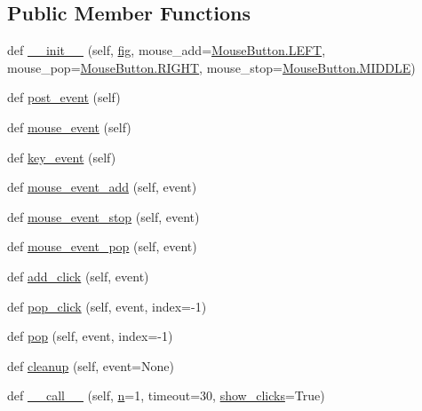 \subsection*{Public Member Functions}
\begin{DoxyCompactItemize}
\item 
def \hyperlink{classmatplotlib_1_1blocking__input_1_1BlockingMouseInput_affed301b1e6e9573ab60438a6ea2d34c}{\+\_\+\+\_\+init\+\_\+\+\_\+} (self, \hyperlink{classmatplotlib_1_1blocking__input_1_1BlockingInput_aee554aa34b7799bef4ad2406ed6a7e0c}{fig}, mouse\+\_\+add=\hyperlink{classmatplotlib_1_1backend__bases_1_1MouseButton_ae8e233d820706cbadfe957ae465eeb95}{Mouse\+Button.\+L\+E\+FT}, mouse\+\_\+pop=\hyperlink{classmatplotlib_1_1backend__bases_1_1MouseButton_a978a5d3296f60f59521a4e671cada7c8}{Mouse\+Button.\+R\+I\+G\+HT}, mouse\+\_\+stop=\hyperlink{classmatplotlib_1_1backend__bases_1_1MouseButton_ae501ff34ab8b37895cebc5046cc651a7}{Mouse\+Button.\+M\+I\+D\+D\+LE})
\item 
def \hyperlink{classmatplotlib_1_1blocking__input_1_1BlockingMouseInput_a520f8923284e9f23298d7ffe991483f1}{post\+\_\+event} (self)
\item 
def \hyperlink{classmatplotlib_1_1blocking__input_1_1BlockingMouseInput_a90e800272f5ea8882944091d53f121a2}{mouse\+\_\+event} (self)
\item 
def \hyperlink{classmatplotlib_1_1blocking__input_1_1BlockingMouseInput_a7502164b08cebf7a5a4fdbbf46fe7c9a}{key\+\_\+event} (self)
\item 
def \hyperlink{classmatplotlib_1_1blocking__input_1_1BlockingMouseInput_a95001e68ea758b9c5b13310ee4655989}{mouse\+\_\+event\+\_\+add} (self, event)
\item 
def \hyperlink{classmatplotlib_1_1blocking__input_1_1BlockingMouseInput_a121b886994eae6b195acaaa41cd84b3b}{mouse\+\_\+event\+\_\+stop} (self, event)
\item 
def \hyperlink{classmatplotlib_1_1blocking__input_1_1BlockingMouseInput_a869fcba664e80ece46f576757d4b3dde}{mouse\+\_\+event\+\_\+pop} (self, event)
\item 
def \hyperlink{classmatplotlib_1_1blocking__input_1_1BlockingMouseInput_aa45ab132b1124fd6cefba6cde04922de}{add\+\_\+click} (self, event)
\item 
def \hyperlink{classmatplotlib_1_1blocking__input_1_1BlockingMouseInput_a1325747ff45b1c9af24fc8d26d25866d}{pop\+\_\+click} (self, event, index=-\/1)
\item 
def \hyperlink{classmatplotlib_1_1blocking__input_1_1BlockingMouseInput_a994b82d2d997251196f0f9273e7d88ac}{pop} (self, event, index=-\/1)
\item 
def \hyperlink{classmatplotlib_1_1blocking__input_1_1BlockingMouseInput_a395077a68d07d2eb8a026bb548434c79}{cleanup} (self, event=None)
\item 
def \hyperlink{classmatplotlib_1_1blocking__input_1_1BlockingMouseInput_a15289a3a48cece51b4cd135a3b72305e}{\+\_\+\+\_\+call\+\_\+\+\_\+} (self, \hyperlink{classmatplotlib_1_1blocking__input_1_1BlockingInput_aa532e64cc6bd2af20bbb5c74a35d84c2}{n}=1, timeout=30, \hyperlink{classmatplotlib_1_1blocking__input_1_1BlockingMouseInput_a2c50d305b7f13b41de5df7530c4ac0a1}{show\+\_\+clicks}=True)
\end{DoxyCompactItemize}
